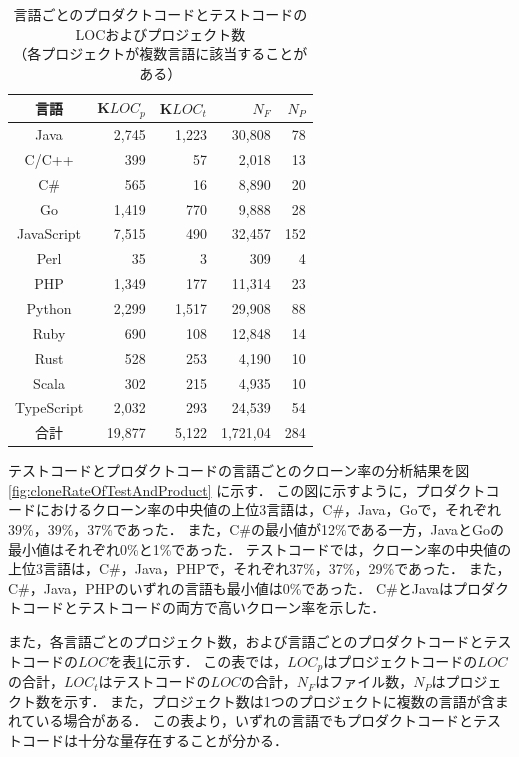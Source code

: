 \documentclass[T,J]{fose}
\begin{document}
\begin{table}[tb]
    \centering
    \caption{言語ごとのプロダクトコードとテストコードのLOCおよびプロジェクト数\\（各プロジェクトが複数言語に該当することがある）}
    \label{table:numberOfCloneSetCountByLabel}
    \small
    \begin{tabular}{|c|r|r|r|r|}
    \hline
    言語 & K$LOC_p$ & K$LOC_t$ & $N_F$ & $N_P$\\
    \hline \hline
    Java & 2,745 & 1,223 & 30,808 &78 \\
    \hline
    C/C++ & 399 & 57 & 2,018 & 13 \\
    \hline
    C\# & 565 & 16 & 8,890 & 20 \\
    \hline
    Go & 1,419 & 770 & 9,888 & 28 \\
    \hline
    JavaScript & 7,515 & 490 & 32,457 & 152 \\
    \hline
    Perl & 35 & 3 & 309 & 4 \\
    \hline
    PHP & 1,349 & 177 & 11,314 & 23 \\
    \hline
    Python & 2,299 & 1,517 & 29,908 & 88 \\
    \hline
    Ruby & 690 & 108 & 12,848 & 14 \\
    \hline
    Rust & 528 & 253 & 4,190 & 10 \\
    \hline
    Scala & 302 & 215 & 4,935 & 10 \\
    \hline
    TypeScript & 2,032 & 293 & 24,539 & 54 \\
    \hline \hline
    合計 & 19,877 & 5,122 & 1,721,04 & 284 \\
    \hline \hline
    \end{tabular}
\end{table}

テストコードとプロダクトコードの言語ごとのクローン率の分析結果を図\ref{fig:cloneRateOfTestAndProduct} に示す．
この図に示すように，プロダクトコードにおけるクローン率の中央値の上位3言語は，C\#，Java，Goで，それぞれ39\%，39\%，37\%であった．
また，C\#の最小値が12\%である一方，JavaとGoの最小値はそれぞれ0\%と1\%であった．
テストコードでは，クローン率の中央値の上位3言語は，C\#，Java，PHPで，それぞれ37\%，37\%，29\%であった．
また，C\#，Java，PHPのいずれの言語も最小値は0\%であった．
C\#とJavaはプロダクトコードとテストコードの両方で高いクローン率を示した．

また，各言語ごとのプロジェクト数，および言語ごとのプロダクトコードとテストコードの$LOC$を表\ref{table:numberOfCloneSetCountByLabel}に示す．
この表では，$LOC_p$はプロジェクトコードの$LOC$の合計，$LOC_t$はテストコードの$LOC$の合計，$N_F$はファイル数，$N_P$はプロジェクト数を示す．
また，プロジェクト数は1つのプロジェクトに複数の言語が含まれている場合がある．
この表より，いずれの言語でもプロダクトコードとテストコードは十分な量存在することが分かる．
\end{document}
